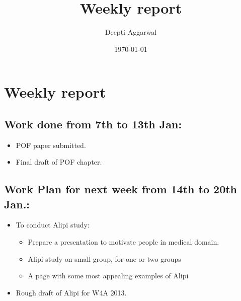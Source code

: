 \documentclass[11pt]{article}
\title{Weekly report}
\author{Deepti Aggarwal}
\date{\today}
\begin{document}
\maketitle

\setcounter{tocdepth}{3}
\vspace*{1cm}
\section{Weekly report}
\label{sec-1}


\subsection{Work done from 7th to 13th Jan:}
\label{sec-1-1}
\begin{itemize}
\item POF paper submitted.
\item Final draft of POF chapter. 
\end{itemize}


\subsection{Work Plan for next week from 14th to 20th Jan.:}
\label{sec-1-2}
\begin{itemize}
\item To conduct Alipi study:
\begin{itemize}
\item Prepare a presentation to motivate people in medical domain.
\item Alipi study on small group, for one or two groups
\item A page with some most appealing examples of Alipi
\end{itemize}
\item Rough draft of Alipi for W4A 2013. 
\end{itemize}
\end{document}
